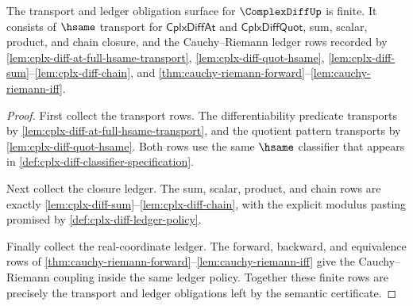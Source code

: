 \begin{theorem}
\label{thm:cplx-diff-transport-ledger-obligation-surface}
The transport and ledger obligation surface for $\ComplexDiffUp$ is finite. It
consists of $\hsame$ transport for $\mathsf{CplxDiffAt}$ and
$\mathsf{CplxDiffQuot}$, sum, scalar, product, and chain closure, and the
Cauchy--Riemann ledger rows recorded by
\autoref{lem:cplx-diff-at-full-hsame-transport},
\autoref{lem:cplx-diff-quot-hsame},
\autoref{lem:cplx-diff-sum}--\autoref{lem:cplx-diff-chain}, and
\autoref{thm:cauchy-riemann-forward}--\autoref{lem:cauchy-riemann-iff}.
\end{theorem}
\begin{proof}
First collect the transport rows. The differentiability predicate transports by
\autoref{lem:cplx-diff-at-full-hsame-transport}, and the quotient pattern
transports by \autoref{lem:cplx-diff-quot-hsame}. Both rows use the same
$\hsame$ classifier that appears in
\autoref{def:cplx-diff-classifier-specification}.

Next collect the closure ledger. The sum, scalar, product, and chain rows are
exactly \autoref{lem:cplx-diff-sum}--\autoref{lem:cplx-diff-chain}, with the
explicit modulus pasting promised by
\autoref{def:cplx-diff-ledger-policy}.

Finally collect the real-coordinate ledger. The forward, backward, and
equivalence rows of
\autoref{thm:cauchy-riemann-forward}--\autoref{lem:cauchy-riemann-iff} give the
Cauchy--Riemann coupling inside the same ledger policy. Together these finite
rows are precisely the transport and ledger obligations left by the semantic
certificate.
\end{proof}

